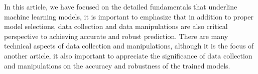 
\par
In this article, we have focused on the detailed fundamentals that underline machine learning models, it is important to emphasize that in addition to proper model selections, data collection and data manipulations are also critical perspective to achieving accurate and robust prediction. There are  many technical aspects of data collection and manipulations, although it is the focus of another article, it also important to appreciate the significance of data collection and manipulations on the accuracy and robustness of the trained models.
\par 
